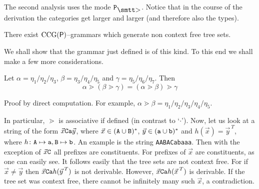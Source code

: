 The second analysis uses the mode $\mbox{\tt P}_{\sgr}$. Notice that 
in the course of the derivation the categories get larger and larger 
(and therefore also the types).
\begin{thm}
There exist $\operatorname{CCG}(\mathsf{P})$--grammars which generate non
context free tree sets.
\end{thm}
We shall show that the grammar just defined is of this kind.
To this end we shall make a few more considerations.
\begin{lem}
\label{lem:assoz}
Let $\alpha = \eta_1/\eta_2/\eta_3$, $\beta =
\eta_3/\eta_4/\eta_5$ and $\gamma = \eta_5/\eta_6/\eta_7$. Then
\begin{equation}
\alpha \gtrdot (\beta \gtrdot \gamma) =
(\alpha \gtrdot \beta) \gtrdot \gamma
\end{equation}
\end{lem}
\proofbeg
Proof by direct computation. For example,
$\alpha \gtrdot \beta = \eta_1/\eta_2/\eta_3/\eta_4/\eta_5$.
\proofend

In particular, $\gtrdot$ is associative if defined
(in contrast to `$\cdot$'). Now, let us look at a string
of the form $\vec{x}\mbox{\tt Ca}\vec{y}$,
where $\vec{x} \in (\mbox{\tt A} \cup \mbox{\tt B})^{\ast}$,
$\vec{y} \in (\mbox{\tt a} \cup \mbox{\tt b})^{\ast}$
and $h(\vec{x})= {\vec{y}\,}^T$, where $h \colon \mbox{\tt A}
\mapsto \mbox{\tt a}, \mbox{\tt B} \mapsto \mbox{\tt b}$.
An example is the string {\tt AABACabaaa}. Then 
with the exception of $\vec{x}\mbox{\tt C}$ all prefixes
are constituents. For prefixes of $\vec{x}$ are constituents, 
as one can easily see. It follows easily that the tree sets 
are not context free. For if $\vec{x} \neq \vec{y}$ then 
$\vec{x}\mbox{\tt Ca}h({\vec{y}\,}^T)$ is not derivable. However, 
$\vec{x}\mbox{\tt Ca}h({\vec{x}\,}^T)$ is derivable. If the tree 
set was context free, there cannot be infinitely many such 
$\vec{x}$, a contradiction.

